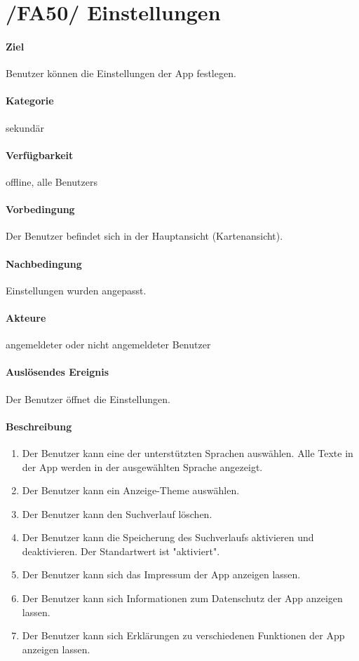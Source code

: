 \section[Einstellungen]{/FA50/ Einstellungen}
\paragraph{Ziel}
\Gls{Benutzer} können die Einstellungen der App festlegen.
\paragraph{Kategorie}
sekundär
\paragraph{Verfügbarkeit}
offline, alle \Glspl{Benutzer}
\paragraph{Vorbedingung}
Der \Gls{Benutzer} befindet sich in der Hauptansicht (\Gls{Kartenansicht}).
\paragraph{Nachbedingung}
Einstellungen wurden angepasst.
\paragraph{Akteure}
angemeldeter oder nicht angemeldeter \Gls{Benutzer}
\paragraph{Auslösendes Ereignis}
Der \Gls{Benutzer} öffnet die Einstellungen.
\paragraph{Beschreibung}
\begin{enumerate}[start=51, label=\textbf{/FA\arabic*/}, align=left]
    \item Der \Gls{Benutzer} kann eine der unterstützten Sprachen auswählen. Alle Texte in der App werden in der ausgewählten Sprache angezeigt.
    \item Der \Gls{Benutzer} kann ein Anzeige-\Gls{Theme} auswählen.
    \item Der \Gls{Benutzer} kann den \Gls{Suchverlauf} löschen.
    \item Der \Gls{Benutzer} kann die Speicherung des \Gls{Suchverlauf}s aktivieren und deaktivieren. Der Standartwert ist "aktiviert".
    \item Der \Gls{Benutzer} kann sich das Impressum der App anzeigen lassen.
    \item Der \Gls{Benutzer} kann sich Informationen zum Datenschutz der App anzeigen lassen.
    \item Der \Gls{Benutzer} kann sich Erklärungen zu verschiedenen Funktionen der App anzeigen lassen.
\end{enumerate}